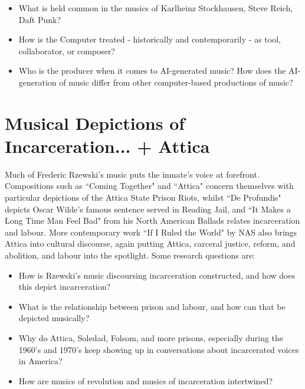 \documentclass[14pt, letterpaper]{article}
\begin{document}
\begin{itemize}

	\item What is held common in the musics of Karlheinz 
	Stockhausen, Steve Reich, Daft Punk? 
	
	\item How is the Computer treated - historically and 
	contemporarily - as tool, collaborator, or composer? 
	
	\item Who is the producer when it comes to AI-generated 
	music? How does the AI-generation of music differ from other 
	computer-based productions of music?

\end{itemize}

\clearpage 

\section*{Musical Depictions of Incarceration... + Attica}
Much of Frederic Rzewski's music puts the inmate's voice at forefront. Compositions 
such as ``Coming Together" and ``Attica" concern themselves with particular 
depictions of the Attica State Prison Riots, whilst ``De Profundis" depicts 
Oscar Wilde's famous sentence served in Reading Jail, and ``It Makes a Long Time 
Man Feel Bad" from his North American Ballads relates incarceration and labour. 
More contemporary work ``If I Ruled the World" by NAS also brings Attica into 
cultural discourse, again putting Attica, carceral justice, reform, and abolition, 
and labour into the spotlight. Some research questions are:

\begin{itemize}

	\item How is Rzewski's music discoursing incarceration constructed, and 
	how does this depict incarceration?
	
	\item What is the relationship between prison and labour, and how can that 
	be depicted musically?
	
	\item Why do Attica, Soledad, Folsom, and more prisons, especially during 
	the 1960's and 1970's keep showing up in conversations about incarcerated 
	voices in America?
	
	\item How are musics of revolution and musics of incarceration intertwined?

\end{itemize}
\end{document}
